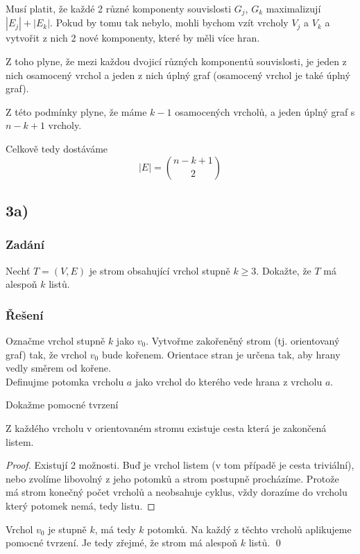 \documentclass[../main.tex]{subfiles}
\begin{document}
Musí platit, že každé 2 různé komponenty souvislosti $G_j$, $G_k$ maximalizují $|E_j| + |E_k|$.
Pokud by tomu tak nebylo, mohli bychom vzít vrcholy $V_j$ a $V_k$ a vytvořit z nich 2 nové komponenty, které by měli více hran.

Z toho plyne, že mezi každou dvojicí různých komponentů souvislosti, je jeden z nich osamocený vrchol a jeden z nich úplný graf
(osamocený vrchol je také úplný graf).

Z této podmínky plyne, že máme $k-1$ osamocených vrcholů, a jeden úplný graf s $n - k + 1$ vrcholy.

Celkově tedy dostáváme 
\begin{equation*}
    |E| = \binom{n - k + 1}{2}
\end{equation*}


\subsection{3a)}
\subsubsection*{Zadání}
Nechť $T=(V,E)$ je strom obsahující vrchol stupně $k\geq 3$.
Dokažte, že $T$ má alespoň $k$ listů.
\subsubsection*{Řešení}
Označme vrchol stupně $k$ jako $v_0$. Vytvořme zakořeněný strom (tj. orientovaný graf) tak, že vrchol $v_0$ bude kořenem. 
Orientace stran je určena tak, aby hrany vedly směrem od kořene. \\
Definujme potomka vrcholu $a$ jako vrchol do kterého vede hrana z vrcholu $a$.

Dokažme pomocné tvrzení
\begin{lemma*}
    Z každého vrcholu v orientovaném stromu existuje cesta která je zakončená listem.
\end{lemma*}
\begin{proof}
    Existují 2 možnosti. Buď je vrchol listem (v tom případě je cesta triviální), 
    nebo zvolíme libovolný z jeho potomků a strom postupně procházíme.
    Protože má strom konečný počet vrcholů a neobsahuje cyklus, 
    vždy dorazíme do vrcholu který potomek nemá, tedy listu. 
\end{proof}

Vrchol $v_0$ je stupně $k$, má tedy $k$ potomků. Na každý z těchto vrcholů aplikujeme pomocné tvrzení.
Je tedy zřejmé, že strom má alespoň $k$ listů. \qed
\end{document}
